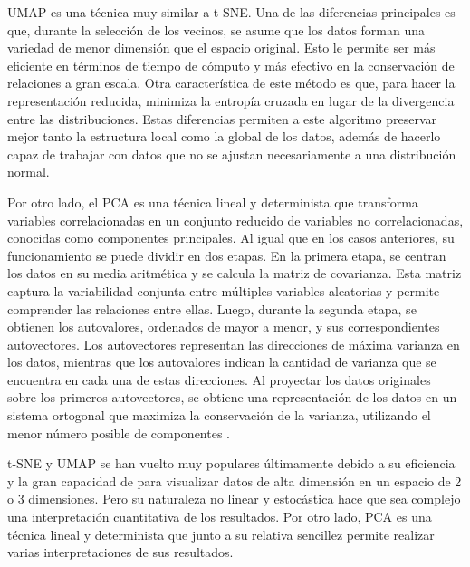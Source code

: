 UMAP es una técnica muy similar a t-SNE. Una de las diferencias principales es que, durante la selección de los vecinos, se asume que los datos forman una variedad de menor dimensión que el espacio original. Esto le permite ser más eficiente en términos de tiempo de cómputo y más efectivo en la conservación de relaciones a gran escala. Otra característica de este método es que, para hacer la representación reducida, minimiza la entropía cruzada en lugar de la divergencia entre las distribuciones. Estas diferencias permiten a este algoritmo preservar mejor tanto la estructura local como la global de los datos, además de hacerlo capaz de trabajar con datos que no se ajustan necesariamente a una distribución normal. \cite{McInnes2018, Becht_2018}

Por otro lado, el PCA es una técnica lineal y determinista que transforma variables correlacionadas en un conjunto reducido de variables no correlacionadas, conocidas como componentes principales. Al igual que en los casos anteriores, su funcionamiento se puede dividir en dos etapas. En la primera etapa, se centran los datos en su media aritmética y se calcula la matriz de covarianza. Esta matriz captura la variabilidad conjunta entre múltiples variables aleatorias y permite comprender las relaciones entre ellas. Luego, durante la segunda etapa, se obtienen los autovalores, ordenados de mayor a menor, y sus correspondientes autovectores. Los autovectores representan las direcciones de máxima varianza en los datos, mientras que los autovalores indican la cantidad de varianza que se encuentra en cada una de estas direcciones. Al proyectar los datos originales sobre los primeros autovectores, se obtiene una representación de los datos en un sistema ortogonal que maximiza la conservación de la varianza, utilizando el menor número posible de componentes \cite{Lever2017}.

t-SNE y UMAP se han vuelto muy populares últimamente debido a su eficiencia y la gran capacidad de para visualizar datos de alta dimensión en un espacio de 2 o 3 dimensiones. Pero su naturaleza no linear y estocástica hace que sea complejo una interpretación cuantitativa de los resultados. Por otro lado, PCA es una técnica lineal y determinista que junto a su relativa sencillez permite realizar varias interpretaciones de sus resultados.


